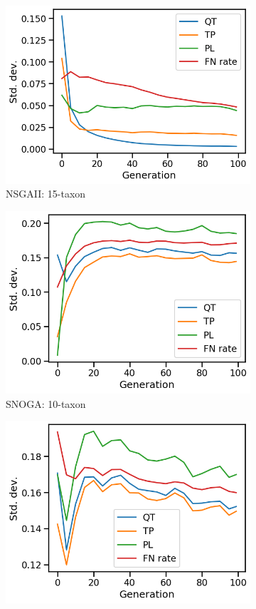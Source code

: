 \begin{figure}[!htbp]
\begin{subfigure}[b]{0.33\textwidth}
			\includegraphics[width=\textwidth]{Figure/15-taxon_NSGAII_std_dev}
			\caption{NSGAII: 15-taxon}
\end{subfigure}
		\begin{subfigure}[b]{0.33\textwidth}
			\includegraphics[width=\textwidth]{Figure/10-taxon_NOSSGA_std_dev}
			\caption{SNOGA: 10-taxon}
\end{subfigure}\begin{subfigure}[b]{0.33\textwidth}
			\includegraphics[width=\textwidth]{Figure/11-taxon_NOSSGA_std_dev}

\end{subfigure}
\end{figure}
